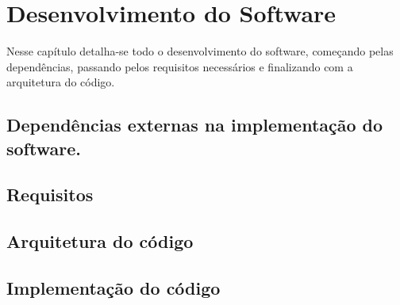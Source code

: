 \chapter{Desenvolvimento do Software}
\label{ch3}
Nesse capítulo detalha-se todo o desenvolvimento do software, começando pelas dependências, passando pelos requisitos necessários e finalizando com a arquitetura do código.

\section{Dependências externas na implementação do software.}

\section{Requisitos}

\section{Arquitetura do código}
    
\section{Implementação do código}